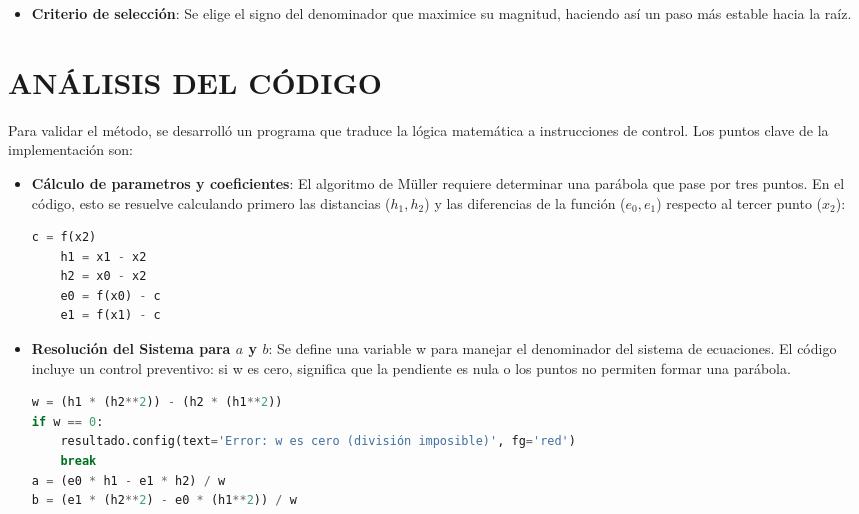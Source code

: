 \documentclass{rmf-d}
\begin{document}
\begin{multicols}{2}
\begin{itemize}
    \item \textbf{Criterio de selección}: Se elige el signo del denominador que maximice su magnitud, haciendo así un paso más estable hacia la raíz.
\end{itemize}



























\section{ANÁLISIS DEL CÓDIGO}
\label{sec:3}
Para validar el método, se desarrolló un programa que traduce la lógica matemática a instrucciones de control. Los puntos clave de la implementación son:
\begin{itemize}
    \item \textbf{Cálculo de parametros y coeficientes}: El algoritmo de Müller requiere determinar una parábola que pase por tres puntos. En el código, esto se resuelve calculando primero las distancias ($h_1, h_2$) y las diferencias de la función ($e_0, e_1$) respecto al tercer punto ($x_2$):
    \begin{lstlisting}[language=Python, caption=Definición de variables auxiliares para la construcción del polinomio cuadrático.]
    c = f(x2)
    h1 = x1 - x2
    h2 = x0 - x2
    e0 = f(x0) - c
    e1 = f(x1) - c
    \end{lstlisting}

    \item \textbf{Resolución del Sistema para $a$ y $b$}: Se define una variable w para manejar el denominador del sistema de ecuaciones. El código incluye un control preventivo: si w es cero, significa que la pendiente es nula o los puntos no permiten formar una parábola.
    \begin{lstlisting}[language=Python, caption=Cálculo de los coeficientes de la parábola y manejo de indeterminaciones.]
    w = (h1 * (h2**2)) - (h2 * (h1**2))
if w == 0:
    resultado.config(text='Error: w es cero (división imposible)', fg='red')
    break
a = (e0 * h1 - e1 * h2) / w
b = (e1 * (h2**2) - e0 * (h1**2)) / w
    \end{lstlisting}


\end{itemize}
\end{multicols}
\end{document}
